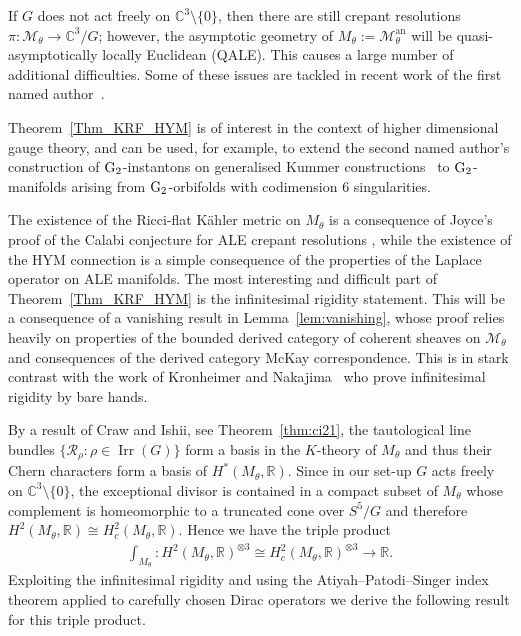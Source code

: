 \documentclass[10pt,a4paper]{amsart}
\numberwithin{equation}{section}
\newcommand{\rG}{{\rm G}}
\newcommand{\cR}{\mathcal{R}}
\newcommand{\sM}{\mathscr{M}}
\newcommand{\R}{{\mathbb R}}
\newcommand{\C}{{\mathbb C}}
\newcommand{\Irr}{\operatorname{Irr}}
\newcommand{\iso}{\cong}
\newcommand{\an}{\mathrm{an}}
\begin{document}
\begin{Remark}
  If $G$ does not act freely on $\C^3{\setminus} \{0\}$, then there are still crepant resolutions $\pi\colon \sM_\theta \to \C^3\!/G$;
  however, the asymptotic geometry of $M_\theta := \sM_\theta^\an$ will be quasi-asymptotically locally Euclidean (QALE).
  This causes a large number of additional dif\/f\/iculties. Some of these
  issues are tackled in recent work of the f\/irst named author~\cite{Degeratu2014}.
\end{Remark}

\begin{Remark}
  Theorem~\ref{Thm_KRF_HYM} is of interest in the context of higher dimensional gauge theory, and can be used,  for example, to extend the second named author's construction of $\rG_2$-instantons on generalised Kummer constructions~\cite{Walpuski2013} to $\rG_2$-manifolds arising from $\rG_2$-orbifolds with codimension $6$ singularities.
\end{Remark}

The existence of the Ricci-f\/lat K\"ahler metric on $M_{\theta}$ is a consequence of Joyce's proof of the Calabi conjecture for ALE crepant resolutions \cite[Section~8]{Joyce2000}, while the existence of the HYM connection is a simple consequence of the properties of the Laplace operator on ALE manifolds.
The most interesting and dif\/f\/icult part of Theorem~\ref{Thm_KRF_HYM} is the inf\/initesimal rigidity statement.
This will be a consequence of a vanishing result in
Lemma~\ref{lem:vanishing}, whose proof relies heavily on properties of the bounded derived category of coherent sheaves on $\sM_\theta$ and consequences of the derived category McKay correspondence.
This is in stark contrast with the work of Kronheimer and Nakajima~\cite{Kronheimer1990} who prove inf\/initesimal rigidity by bare hands.


By a result of Craw and Ishii, see Theorem~\ref{thm:ci21}, the tautological line bundles $\{\cR_{\rho}\colon \rho \in \Irr(G) \}$ form a basis in the $K$-theory of $M_\theta$ and thus their Chern characters form a basis of $H^*(M_{\theta}, \R)$. Since in our set-up $G$ acts freely on $\C^3{\setminus} \{0\}$, the exceptional divisor is contained in a compact subset of $M_\theta$ whose complement is homeomorphic to a truncated cone over $S^5/G$ and therefore $H^2(M_{\theta}, \R)\iso H^2_c(M_{\theta},\R)$. Hence we have the triple product
\begin{gather}\label{eq:triple-prod}
  \int_{M_\theta}\colon H^2(M_\theta,\R)^{\otimes 3} \iso H^2_c(M_\theta,\R)^{\otimes 3} \to\R.
\end{gather}
Exploiting the inf\/initesimal rigidity and using the Atiyah--Patodi--Singer index theorem applied to carefully chosen Dirac
operators we derive the following result for this triple product.
\end{document}

